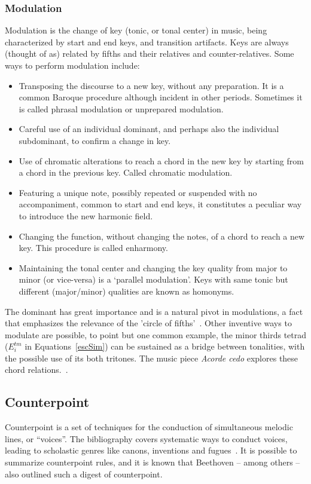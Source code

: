 \subsubsection{Modulation}
Modulation is the change of key (tonic, or tonal center) in music, being characterized by start and end keys, and transition artifacts.
Keys are always (thought of as) related by fifths and their relatives and counter-relatives. Some ways to perform modulation include:
\begin{itemize}
    \item Transposing the discourse to a new key, without any preparation.
	    It is a common Baroque procedure although incident in other periods. Sometimes it is 
    called phrasal modulation or unprepared modulation.
    \item Careful use of an individual dominant, and perhaps also the individual
    subdominant, to confirm a change in key.
    \item Use of chromatic alterations to reach a chord in the new key by starting from a chord in the previous key. Called chromatic modulation.
    \item Featuring a unique note, possibly repeated or suspended with no accompaniment, common to start and end keys, it constitutes a peculiar way
    to introduce the new harmonic field.
    \item Changing the function, without changing the notes, of a chord to
    reach a new key. This procedure is called enharmony.
    \item Maintaining the tonal center and changing the key quality from major to minor
    (or vice-versa) is a `parallel modulation'. Keys with same tonic but
		different (major/minor) qualities are known as homonyms.
\end{itemize}

The dominant has great importance and is a natural pivot in modulations,
a fact that emphasizes the relevance of the 'circle of fifths'~\cite{Harmonia,Salzer,Koellheuteur,Harmony}.
Other inventive ways to modulate are possible, to point but one common example, the minor thirds tetrad ($E_i^{tm}$ in Equations~\ref{escSim}) can be sustained as a bridge between tonalities, with the possible use of its both tritones.
The music piece \emph{Acorde cedo} explores these chord relations.~\cite{MASSA}.

\subsection{Counterpoint}\label{subsec:contraponto}
Counterpoint is a set of techniques for the conduction of simultaneous melodic lines, or ``voices''.
The bibliography covers systematic ways to conduct voices, leading to scholastic genres like canons, inventions and fugues~\cite{Fux,SchoenbergContra}. It is possible to
summarize counterpoint rules, and it is known that Beethoven --
among others -- also outlined such a digest of counterpoint.


